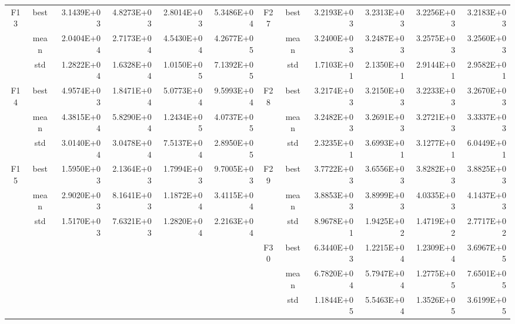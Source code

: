 \documentclass{wzuthesis}
\begin{document}
\begin{table}[htbp]
\begin{tabular}{rrrrrrccrrrr}
    \multicolumn{1}{c}{\multirow{3}[0]{*}{F13}} & \multicolumn{1}{c}{best} & 3.1439E+03 & 4.8273E+03 & 2.8014E+03 & 5.3486E+04 & \multirow{3}[0]{*}{F27} & best  & 3.2193E+03 & 3.2313E+03 & 3.2256E+03 & 3.2183E+03 \\
          & \multicolumn{1}{c}{mean} & 2.0404E+04 & 2.7173E+04 & 4.5430E+04 & 4.2677E+05 &       & mean  & 3.2400E+03 & 3.2487E+03 & 3.2575E+03 & 3.2560E+03 \\
          & \multicolumn{1}{c}{std} & 1.2822E+04 & 1.6328E+04 & 1.0150E+05 & 7.1392E+05 &       & std   & 1.7103E+01 & 2.1350E+01 & 2.9144E+01 & 2.9582E+01 \\
    \multicolumn{1}{c}{\multirow{3}[0]{*}{F14}} & \multicolumn{1}{c}{best} & 4.9574E+03 & 1.8471E+04 & 5.0773E+04 & 9.5993E+04 & \multirow{3}[0]{*}{F28} & best  & 3.2174E+03 & 3.2150E+03 & 3.2233E+03 & 3.2670E+03 \\
          & \multicolumn{1}{c}{mean} & 4.3815E+04 & 5.8290E+04 & 1.2434E+05 & 4.0737E+05 &       & mean  & 3.2482E+03 & 3.2691E+03 & 3.2721E+03 & 3.3337E+03 \\
          & \multicolumn{1}{c}{std} & 3.0140E+04 & 3.0478E+04 & 7.5137E+04 & 2.8950E+05 &       & std   & 2.3235E+01 & 3.6993E+01 & 3.1277E+01 & 6.0449E+01 \\
    \multicolumn{1}{c}{\multirow{3}[0]{*}{F15}} & \multicolumn{1}{c}{best} & 1.5950E+03 & 2.1364E+03 & 1.7994E+03 & 9.7005E+03 & \multirow{3}[0]{*}{F29} & best  & 3.7722E+03 & 3.6556E+03 & 3.8282E+03 & 3.8825E+03 \\
          & \multicolumn{1}{c}{mean} & 2.9020E+03 & 8.1641E+03 & 1.1872E+04 & 3.4115E+04 &       & mean  & 3.8853E+03 & 3.8999E+03 & 4.0335E+03 & 4.1437E+03 \\
          & \multicolumn{1}{c}{std} & 1.5170E+03 & 7.6321E+03 & 1.2820E+04 & 2.2163E+04 &       & std   & 8.9678E+01 & 1.9425E+02 & 1.4719E+02 & 2.7717E+02 \\
          &       &       &       &       &       & \multirow{3}[0]{*}{F30} & best  & 6.3440E+03 & 1.2215E+04 & 1.2309E+04 & 3.6967E+05 \\
          &       &       &       &       &       &       & mean  & 6.7820E+04 & 5.7947E+04 & 1.2775E+05 & 7.6501E+05 \\
          &       &       &       &       &       &       & std   & 1.1844E+05 & 5.5463E+04 & 1.3526E+05 & 3.6199E+05 \\
    \bottomrule
    \end{tabular}%
  \label{tb:irime-ablation-dim50}%
\end{table}%
\end{document}
